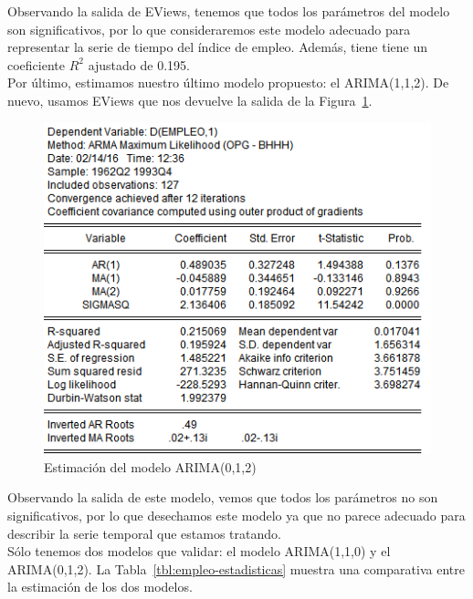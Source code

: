 \documentclass[12pt,a4paper,twoside,openright,titlepage,final]{article}
\begin{document}
Observando la salida de EViews, tenemos que todos los parámetros del modelo son significativos, por lo que consideraremos este modelo adecuado para representar la serie de tiempo del índice de empleo. Además, tiene tiene un coeficiente $R^2$ ajustado de 0.195.\\

Por último, estimamos nuestro último modelo propuesto: el ARIMA(1,1,2). De nuevo, usamos EViews que nos devuelve la salida de la Figura~\ref{fig:modelo3-estadisticas}.\\

\begin{figure}[tbph!]
	\centering
	\includegraphics[width=0.7\linewidth]{imagenes/empleo/modelo3-estadisticas.png}
	\caption{Estimación del modelo ARIMA(0,1,2)}
	\label{fig:modelo3-estadisticas}
\end{figure}

Observando la salida de este modelo, vemos que todos los parámetros no son significativos, por lo que desechamos este modelo ya que no parece adecuado para describir la serie temporal que estamos tratando.\\

Sólo tenemos dos modelos que validar: el modelo ARIMA(1,1,0) y el ARIMA(0,1,2). La Tabla~\ref{tbl:empleo-estadisticas} muestra una comparativa entre la estimación de los dos modelos.\\
\end{document}
